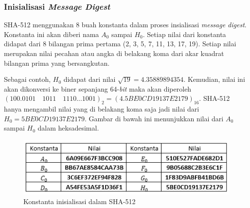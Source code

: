 \subsubsection{Inisialisasi \textit{Message Digest}}
SHA-512 menggunakan 8 buah konstanta dalam proses insialisasi \textit{message digest}. Konstanta ini akan diberi nama \begin{math}A_0\end{math} sampai \begin{math}H_0\end{math}. Setiap nilai dari konstanta didapat dari 8 bilangan prima pertama (2, 3, 5, 7, 11, 13, 17, 19). Setiap nilai merupakan nilai pecahan atau angka di belakang koma dari akar kuadrat bilangan prima yang bersangkutan.

Sebagai contoh, \begin{math}H_0\end{math} didapat dari nilai \begin{math}\sqrt{19} = 4.35889894354\end{math}. Kemudian, nilai ini akan dikonversi ke biner sepanjang 64-\textit{bit} maka akan diperoleh \begin{math}(100.0101\quad 1011\quad 1110 ... 1001)_2=(4.5BE0CD19137E2179)_{16}\end{math}. SHA-512 hanya mengambil nilai yang di belakang koma saja jadi nilai dari \begin{math}H_0 = 5BE0CD19137E2179\end{math}. Gambar di bawah ini menunjukkan nilai dari \begin{math}A_0\end{math} sampai \begin{math}H_0\end{math} dalam heksadesimal.

\begin{figure}[ht]
	\includegraphics[scale=0.8]{Gambar/konstanta_sha}
	\centering
	\caption{Konstanta inisialisasi dalam SHA-512}\label{fig:konstanta_sha}
\end{figure}

